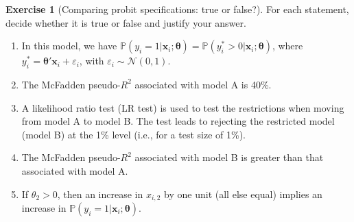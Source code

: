 \documentclass[
  11pt,
]{book}
\theoremstyle{definition}
\theoremstyle{definition}
\theoremstyle{definition}
\newtheorem{exercise}{Exercise}[chapter]
\theoremstyle{definition}
\theoremstyle{remark}
\begin{document}
\begin{exercisebox}
\begin{exercise}[Comparing probit specifications: true or false?]
For each statement, decide whether it is true or false and justify your answer.

\begin{enumerate}
\def\labelenumi{\arabic{enumi}.}
\item
  In this model, we have \(\mathbb{P}(y_i = 1 | \mathbf{x}_i; \boldsymbol{\theta}) = \mathbb{P}(y_i^* > 0 | \mathbf{x}_i; \boldsymbol{\theta})\), where \(y_i^* = \boldsymbol{\theta}'\mathbf{x}_i + \varepsilon_i\), with \(\varepsilon_i \sim \mathcal{N}(0, 1)\).
\item
  The McFadden pseudo-\(R^2\) associated with model A is 40\%.
\item
  A likelihood ratio test (LR test) is used to test the restrictions when moving from model A to model B. The test leads to rejecting the restricted model (model B) at the 1\% level (i.e., for a test size of 1\%).
\item
  The McFadden pseudo-\(R^2\) associated with model B is greater than that associated with model A.
\item
  If \(\theta_2 > 0\), then an increase in \(x_{i,2}\) by one unit (all else equal) implies an increase in \(\mathbb{P}(y_i = 1 | \mathbf{x}_i; \boldsymbol{\theta})\).
\end{enumerate}

\end{exercise}

\end{exercisebox}

\end{document}
